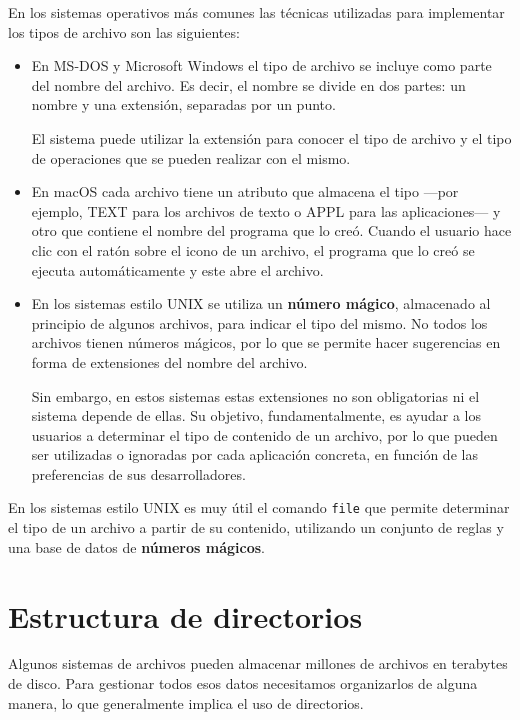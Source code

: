 En los sistemas operativos más comunes las técnicas utilizadas para
implementar los tipos de archivo son las siguientes:

\begin{itemize}
\item
  En MS-DOS y Microsoft Windows el tipo de archivo se incluye como parte
  del nombre del archivo. Es decir, el nombre se divide en dos partes:
  un nombre y una extensión, separadas por un punto.

  El sistema puede utilizar la extensión para conocer el tipo de archivo
  y el tipo de operaciones que se pueden realizar con el mismo.
\item
  En macOS cada archivo tiene un atributo que almacena el tipo ---por
  ejemplo, TEXT para los archivos de texto o APPL para las
  aplicaciones--- y otro que contiene el nombre del programa que lo
  creó. Cuando el usuario hace clic con el ratón sobre el icono de un
  archivo, el programa que lo creó se ejecuta automáticamente y este
  abre el archivo.
\item
  En los sistemas estilo UNIX se utiliza un \textbf{número mágico},
  almacenado al principio de algunos archivos, para indicar el tipo del
  mismo. No todos los archivos tienen números mágicos, por lo que se
  permite hacer sugerencias en forma de extensiones del nombre del
  archivo.

  Sin embargo, en estos sistemas estas extensiones no son obligatorias
  ni el sistema depende de ellas. Su objetivo, fundamentalmente, es
  ayudar a los usuarios a determinar el tipo de contenido de un archivo,
  por lo que pueden ser utilizadas o ignoradas por cada aplicación
  concreta, en función de las preferencias de sus desarrolladores.
\end{itemize}

En los sistemas estilo UNIX es muy útil el comando \texttt{file} que
permite determinar el tipo de un archivo a partir de su contenido,
utilizando un conjunto de reglas y una base de datos de \textbf{números
mágicos}.

\section{Estructura de directorios}\label{_estructura_de_directorios_2}

Algunos sistemas de archivos pueden almacenar millones de archivos en
terabytes de disco. Para gestionar todos esos datos necesitamos
organizarlos de alguna manera, lo que generalmente implica el uso de
directorios.

